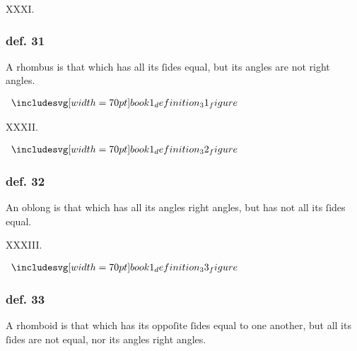 \hfill

\begin{center}
  XXXI.\label{book1def31}\\
\end{center}
\begin{minipage}{0.67\textwidth}
  \subsubsection{def. 31}
  \begin{center}
    \raggedright A rhombus is that which has all its ſides equal, but its angles are not right angles.
  \end{center}
\end{minipage}%
\begin{minipage}{0.33\textwidth}
  \begin{center}
    $\img[0][0][70]{book1_definition_31_figure}$
  \end{center}
\end{minipage}

\hfill

\begin{center}
  XXXII.\label{book1def32}\\
\end{center}
\begin{minipage}{0.33\textwidth}
  \begin{center}
    $\img[0][0][70]{book1_definition_32_figure}$
  \end{center}
\end{minipage}%
\begin{minipage}{0.67\textwidth}
  \subsubsection{def. 32}
  \begin{center}
    \raggedright An oblong is that which has all its angles right angles, but has not all its ſides equal.
  \end{center}
\end{minipage}

\hfill

\begin{center}
  XXXIII.\label{book1def33}\\
\end{center}
\begin{minipage}{0.33\textwidth}
  \begin{center}
    $\img[0][0][70]{book1_definition_33_figure}$
  \end{center}
\end{minipage}%
\begin{minipage}{0.67\textwidth}
  \subsubsection{def. 33}
  \begin{center}
    \raggedright A rhomboid is that which has its oppoſite ſides equal to one another, but all its ſides are not equal, nor its angles right angles.
  \end{center}
\end{minipage}

